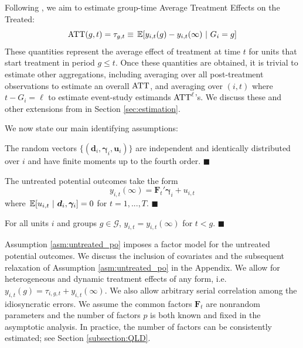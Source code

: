 \documentclass[12pt]{article}
\begin{document}
Following \citet{Callaway_Santanna_2021}, we aim to estimate group-time Average Treatment Effects on the Treated:
\begin{equation}
  \ATT(g,t) = \tau_{g,t} \equiv \expec{y_{i,t}(g) - y_{i,t}(\infty)}{G_i = g} 
\end{equation}
These quantities represent the average effect of treatment at time $t$ for units that start treatment in period $g \leq t$. Once these quantities are obtained, it is trivial to estimate other aggregations, including averaging over all post-treatment observations to estimate an overall $\text{ATT}$, and averaging over $(i,t)$ where $t - G_i = \ell$ to estimate event-study estimands $\text{ATT}^\ell$'s. We discuss these and other extensions from \citet{Callaway_Santanna_2021} in Section \ref{sec:estimation}.

We now state our main identifying assumptions:
\begin{assumption}\label{asm:sampling}
The random vectors $\{ (\bm d_i, \bm \gamma_i, \bm u_i) \}$ are independent and identically distributed over $i$ and have finite moments up to the fourth order. $\blacksquare$
\end{assumption}

\begin{assumption}\label{asm:untreated_po}
The untreated potential outcomes take the form
\begin{equation*}
  y_{i,t}(\infty) = \bm{F}_t' \bm \gamma_i + u_{i,t}
\end{equation*}
where $\expec{u_{i,t}}{\bm d_i, \bm \gamma_i} = 0$ for $t = 1,...,T$. $\blacksquare$
\end{assumption}

\begin{assumption}\label{asm:no_anticipation}
For all units $i$ and groups $g \in \mathcal{G}$, $y_{i,t} = y_{i,t}(\infty)$ for $t < g$. $\blacksquare$ %
\end{assumption}

Assumption \ref{asm:untreated_po} imposes a factor model for the untreated potential outcomes. We discuss the inclusion of covariates and the subsequent relaxation of Assumption \ref{asm:untreated_po} in the Appendix. We allow for heterogeneous and dynamic treatment effects of any form, i.e. $y_{i,t}(g) = \tau_{i,g,t} + y_{i,t}(\infty)$. We also allow arbitrary serial correlation among the idiosyncratic errors. We assume the common factors $\bm{F}_t$ are nonrandom parameters and the number of factors $p$ is both known and fixed in the asymptotic analysis. In practice, the number of factors can be consistently estimated; see Section \ref{subsection:QLD}. 
\end{document}
